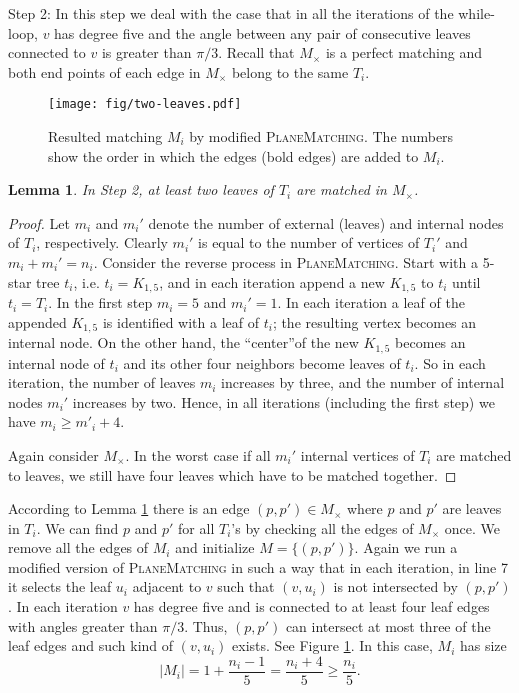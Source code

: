 \documentclass[11pt,a4paper]{article}
\newcommand{\MC}{M_\times}
\newtheorem{lemma}{Lemma}
\begin{document}
\begin{paragraph}{Step 2:}
In this step we deal with the case that in all the iterations of the while-loop, $v$ has degree five and the angle between any pair of consecutive leaves connected to $v$ is greater than $\pi/3$. Recall that $\MC$ is a perfect matching and both end points of each
edge in $\MC$ belong to the same $T_i$.

\begin{figure}[ht]
  \centering
    \texttt{[image: fig/two-leaves.pdf]}
  \caption{Resulted matching $M_i$ by modified {\scshape PlaneMatching}. The numbers show the order in which the edges (bold edges) are added to $M_i$.}
\label{two-leaves-fig}
\end{figure}

\begin{lemma}
\label{two-leaves-lemma}
In Step 2, at least two leaves of $T_i$ are matched in $\MC$.
\end{lemma}
\begin{proof}
 Let $m_i$ and $m_i'$ denote the number of external (leaves) and internal nodes of $T_i$, respectively. Clearly $m_i'$ is equal to the number of vertices of $T_i'$ and $m_i+m_i'=n_i$. Consider the reverse process in {\scshape PlaneMatching}. Start with a 5-star tree $t_i$, i.e. $t_i=K_{1,5}$, and in each iteration append a new $K_{1,5}$ to $t_i$ until $t_i=T_i$. In the first step $m_i=5$ and $m_i'=1$. In each iteration a leaf of the appended $K_{1,5}$ is identified with a leaf of $t_i$; the resulting vertex becomes an internal node. On the other hand, the \textquotedblleft center\textquotedblright of the new $K_{1,5}$ becomes an internal node of $t_i$ and its other four neighbors become leaves of $t_i$. So in each iteration, the number of leaves $m_i$ increases by three, and the number of internal nodes $m_i'$ increases by two. Hence, in all iterations (including the first step) we have $m_i\ge m'_i+4$.

Again consider $\MC$. In the worst case if all $m_i'$ internal vertices of $T_i$ are matched to leaves, we still have four leaves which have to be matched together.   
\end{proof}

According to Lemma \ref{two-leaves-lemma} there is an edge $(p,p')\in \MC$ where $p$ and $p'$ are leaves in $T_i$. We can find $p$ and $p'$ for all $T_i$'s by checking all the edges of $\MC$ once. We remove all the edges of $M_i$ and initialize $M=\{(p,p')\}$. Again we run a modified version of {\scshape PlaneMatching} in such a way that in each iteration, in line 7 it selects the leaf $u_i$ adjacent to $v$ such that $(v, u_i)$ is not intersected by $(p,p')$. In each iteration $v$ has degree five and is connected to at least four leaf edges with angles greater than $\pi/3$. Thus, $(p,p')$ can intersect at most three of the leaf edges and such kind of $(v, u_i)$ exists. See Figure \ref{two-leaves-fig}. In this case, $M_i$ has size
$$
 |M_i| = 1+\frac{n_i-1}{5}=\frac{n_i+4}{5}\ge\frac{n_i}{5}.
$$

\end{paragraph}
\end{document}
